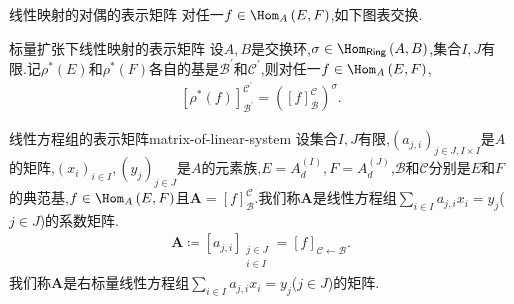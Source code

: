 \begin{proposition}{线性映射的对偶的表示矩阵}{}
	对任一$f\in\Hom_{A}\left(E,F\right)$,如下图表交换.
	\begin{center}
	\end{center}
\end{proposition}

\begin{proposition}{标量扩张下线性映射的表示矩阵}{}
	设$A,B$是交换环,$\sigma\in\Hom_{\mathsf{Ring}}\left(A,B\right)$,集合$I,J$有限.记$\rho^{\ast}\left(E\right)$和$\rho^{\ast}\left(F\right)$各自的基是$\mathcal{B}^{\prime}$和$\mathcal{C}^{\prime}$,则对任一$f\in\Hom_{A}\left(E,F\right)$,
	\begin{align*}
		\left[\rho^{\ast}\left(f\right)\right]_{\mathcal{B}^{\prime}}^{\mathcal{C}^{\prime}}=\left(\left[f\right]_{\mathcal{B}}^{\mathcal{C}}\right)^{\sigma}.
	\end{align*}
\end{proposition}

\begin{definition}{线性方程组的表示矩阵}{matrix-of-linear-system}
	设集合$I,J$有限,$\left(a_{j,i}\right)_{j\in J,I\times I}$是$A$的矩阵,$\left(x_{i}\right)_{i\in I},\left(y_{j}\right)_{j\in J}$是$A$的元素族,$E=A_{d}^{\left(I\right)},F=A_{d}^{\left(J\right)}$,$\mathcal{B}$和$\mathcal{C}$分别是$E$和$F$的典范基,$f\in\Hom_{A}\left(E,F\right)$且$\boldsymbol{A}=\left[f\right]_{\mathcal{B}}^{\mathcal{C}}$.我们称$\boldsymbol{A}$是线性方程组$\sum\limits_{i\in I}a_{j,i}x_{i}=y_{j}$($j\in J$)的系数矩阵.
	\begin{align*}
		\boldsymbol{A}\coloneq\left[a_{j,i}\right]_{\substack{j\in J\\i\in I}}=\left[f\right]_{\mathcal{C}\leftarrow\mathcal{B}}.
	\end{align*}
	我们称$\boldsymbol{A}$是右标量线性方程组$\sum\limits_{i\in I}a_{j,i}x_{i}=y_{j}$($j\in J$)的矩阵.
\end{definition}

